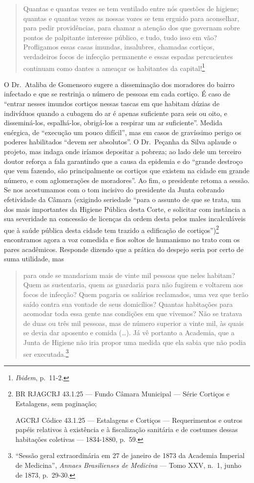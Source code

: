 \begin{quote}
Quantas e quantas vezes se tem ventilado entre nós questões de higiene;
quantas e quantas vezes as nossas vozes se tem erguido para aconselhar,
para pedir providências, para chamar a atenção dos que governam sobre
pontos de palpitante interesse público, e tudo, tudo isso em vão?
Profligamos essas casas imundas, insalubres, chamadas cortiços,
verdadeiros focos de infecção permanente e essas espadas percucientes
continuam como dantes a ameaçar os habitantes da capital!\footnote{\textit{Ibidem},
  p.~11-2.}
\end{quote}

O Dr.~Ataliba de Gomensoro sugere a disseminação dos moradores do bairro
infectado e que se restrinja o número de pessoas em cada cortiço. É caso
de ``entrar nesses imundos cortiços nessas tascas em que habitam dúzias
de indivíduos quando a cubagem do ar é apenas suficiente para seis ou
oito, e disseminá-los, espalhá-los, obrigá-los a respirar um ar
suficiente''. Medida enérgica, de ``execução um pouco difícil'', mas em
casos de gravíssimo perigo os poderes habilitados ``devem ser
absolutos''. O Dr.~Peçanha da Silva aplaude o projeto, mas indaga onde
iríamos depositar a pobreza; ao lado dele um terceiro doutor reforça a
fala garantindo que a causa da epidemia e do ``grande destroço que vem
fazendo, são principalmente os cortiços que existem na cidade em grande
número, e com aglomerações de moradores''. Ao fim, o presidente retoma a
sessão. Se nos acostumamos com o tom incisivo do presidente da Junta
cobrando efetividade da Câmara (exigindo seriedade ``para o assunto de
que se trata, um dos mais importantes da Higiene Pública desta Corte, e
solicitar com instância a sua severidade na concessão de licenças da
ordem desta pelos males incalculáveis que à saúde pública desta cidade
tem trazido a edificação de cortiços'')\footnote{BR RJAGCRJ 43.1.25 ---
  Fundo Câmara Municipal --- Série Cortiços e Estalagens, sem paginação;

  AGCRJ Códice 43.1.25 --- Estalagens e Cortiços --- Requerimentos e
  outros papéis relativos à existência e à fiscalização sanitária e de
  costumes dessas habitações coletivas --- 1834-1880, p.~59.} encontramos
agora a voz comedida e fios soltos de humanismo no trato com os pares
acadêmicos. Responde dizendo que a prática do despejo seria por certo de
suma utilidade, mas

\begin{quote}
para onde se mandariam mais de vinte mil pessoas que neles habitam? Quem
as sustentaria, quem as guardaria para não fugirem e voltarem aos focos
de infecção? Quem pagaria os salários reclamados, uma vez que terão
saído contra sua vontade de seus domicílios? Quantas habitações para
acomodar toda essa gente nas condições em que vivemos? Não se tratava de
duas ou três mil pessoas, mas de número superior a vinte mil, às quais
se devia dar aposento e comida (\dots{}). Já vê portanto a Academia, que a
Junta de Higiene não iria propor uma medida que ela sabia que não podia
ser executada.\footnote{``Sessão geral extraordinária em 27 de janeiro
  de 1873 da Academia Imperial de Medicina'', \textit{Annaes Brasilienses
  de Medicina} --- Tomo XXV, n.~1, junho de 1873, p.~29-30.}
\end{quote}

